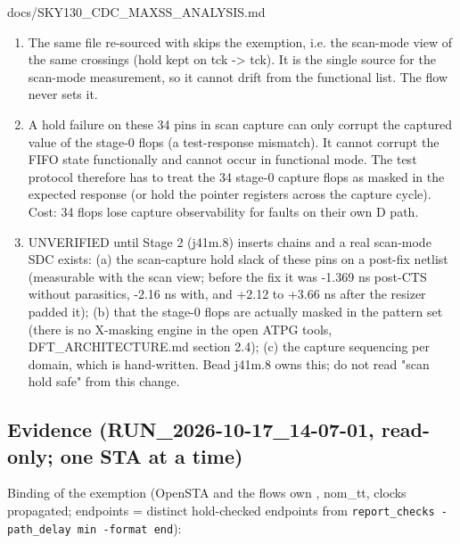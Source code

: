 \begin{relocated}{docs/SKY130_CDC_MAXSS_ANALYSIS.md}
\begin{enumerate}
\def\labelenumi{\arabic{enumi}.}
\tightlist
\item
  The same file re-sourced with  skips the
  exemption, i.e. the scan-mode view of the same crossings (hold kept on
  tck -\textgreater{} tck). It is the single source for the scan-mode
  measurement, so it cannot drift from the functional list. The flow
  never sets it.
\item
  A hold failure on these 34 pins in scan capture can only corrupt the
  captured value of the stage-0 flops (a test-response mismatch). It
  cannot corrupt the FIFO state functionally and cannot occur in
  functional mode. The test protocol therefore has to treat the 34
  stage-0 capture flops as masked in the expected response (or hold the
  pointer registers across the capture cycle). Cost: 34 flops lose
  capture observability for faults on their own D path.
\item
  UNVERIFIED until Stage 2 (j41m.8) inserts chains and a real scan-mode
  SDC exists: (a) the scan-capture hold slack of these pins on a
  post-fix netlist (measurable with the scan view; before the fix it was
  -1.369 ns post-CTS without parasitics, -2.16 ns with, and +2.12 to
  +3.66 ns after the resizer padded it); (b) that the stage-0 flops are
  actually masked in the pattern set (there is no X-masking engine in
  the open ATPG tools, DFT\_\allowbreak{}ARCHITECTURE.md section 2.4);
  (c) the capture sequencing per domain, which is hand-written. Bead
  j41m.8 owns this; do not read "scan hold safe" from this change.
\end{enumerate}

\subsection{\texorpdfstring{Evidence
(RUN\_\allowbreak{}2026-10-17\_\allowbreak{}14-07-01, read-only; one STA
at a
time)}{Evidence (RUN\_2026-10-17\_14-07-01, read-only; one STA at a time)}}\label{tm:pd:sky130-cdc-maxss:7-evidence-run-2026-10-17-14-07-01-read-only-one-sta-at-a-time}

Binding of the exemption (OpenSTA  and the
flow\textquotesingle s own , nom\_tt, clocks propagated;
endpoints = distinct hold-checked endpoints from
\texttt{report\_\allowbreak{}checks\ -\allowbreak{}path\_\allowbreak{}delay\ min\ -\allowbreak{}format\ end}):


\end{relocated}
